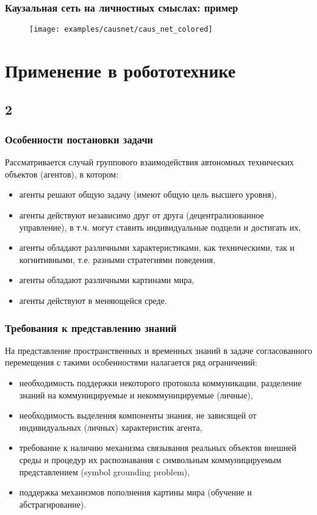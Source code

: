 \documentclass[default]{beamer}
\begin{document}
	\begin{frame}
		\frametitle{Каузальная сеть на личностных смыслах: пример}
		
		\begin{figure}
		\texttt{[image: examples/causnet/caus\_net\_colored]}
		\end{figure}
		
	\end{frame}	
	
	\section{Применение в робототехнике}
	\subsection{2}

	\begin{frame}
		\frametitle{Особенности постановки задачи}
		
		Рассматривается случай группового взаимодействия автономных технических объектов (агентов), в котором:
		\begin{itemize}
			\item агенты решают общую задачу (имеют общую цель высшего уровня),
			\item агенты действуют независимо друг от друга (децентрализованное управление), в т.ч. могут ставить индивидуальные подцели и достигать их,
			\item агенты обладают различными характеристиками, как техническими, так и когнитивными, т.е. разными стратегиями поведения,
			\item агенты обладают различными картинами мира,
			\item агенты действуют в меняющейся среде.
		\end{itemize}
		
	\end{frame}

	\begin{frame}
		\frametitle{Требования к представлению знаний}
		
		На представление пространственных и временных знаний в задаче согласованного перемещения с такими особенностями налагается ряд ограничений:
		\begin{itemize}
		\item необходимость поддержки некоторого протокола коммуникации, разделение знаний на коммуницируемые и некоммуницируемые (личные),
		\item необходимость выделения компоненты знания, не зависящей от индивидуальных (личных) характеристик агента,
		\item требование к наличию механизма связывания реальных объектов внешней среды и процедур их распознавания с символьным коммуницируемым представлением (symbol grounding problem),
		\item поддержка механизмов пополнения картины мира (обучение и абстрагирование).
		\end{itemize}
	\end{frame}
\end{document}
